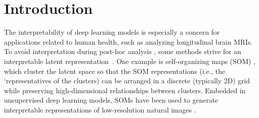 \documentclass[runningheads]{llncs}
\begin{document}
\section{Introduction}


The interpretability of deep learning models is especially a concern for applications related to human health, such as analyzing longitudinal brain MRIs. To avoid interpretation during post-hoc analysis \cite{li2018deep,rudin2019stop}, some methods strive for an interpretable latent representation~\cite{molnar2020interpretable}. One example is self-organizing maps (SOM) \cite{kohonen1990self}, which cluster the latent space so that the SOM representations (i.e., the `representatives of the clusters) can be arranged in a discrete (typically 2D) grid while preserving high-dimensional relationships between clusters. Embedded in unsupervised deep learning models, SOMs have been used to generate interpretable representations of low-resolution natural images \cite{fortuin2018som,manduchi2019dpsom}. 
\end{document}
